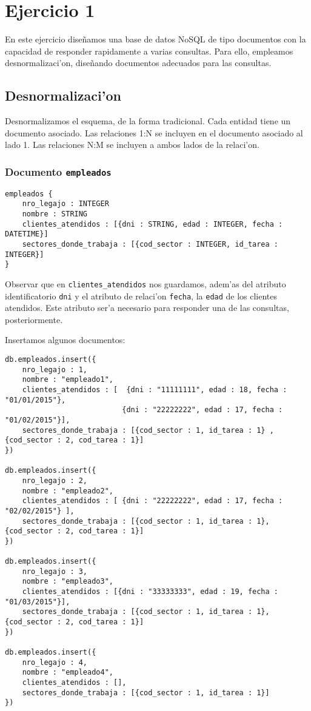 \section{Ejercicio 1}

En este ejercicio dise\~namos una base de datos NoSQL de tipo documentos con la capacidad de responder rapidamente a varias consultas. Para ello, empleamos desnormalizaci'on, dise\~nando documentos adecuados para las consultas.

\subsection{Desnormalizaci'on}

Desnormalizamos el esquema, de la forma tradicional. Cada entidad tiene un documento asociado. Las relaciones 1:N se incluyen en el documento asociado al lado 1. Las relaciones N:M se incluyen a ambos lados de la relaci'on.

\subsubsection{Documento \texttt{empleados}}

\begin{verbatim}
empleados {
    nro_legajo : INTEGER
    nombre : STRING
    clientes_atendidos : [{dni : STRING, edad : INTEGER, fecha : DATETIME}]
    sectores_donde_trabaja : [{cod_sector : INTEGER, id_tarea : INTEGER}]
}
\end{verbatim}

Observar que en \texttt{clientes\_atendidos} nos guardamos, adem'as del atributo identificatorio \texttt{dni} y el atributo de relaci'on \texttt{fecha}, la \texttt{edad} de los clientes atendidos. Este atributo ser'a necesario para responder una de las consultas, posteriormente. 

Insertamos algunos documentos:

\begin{verbatim}
db.empleados.insert({
    nro_legajo : 1,
    nombre : "empleado1",
    clientes_atendidos : [	{dni : "11111111", edad : 18, fecha : "01/01/2015"},
                           {dni : "22222222", edad : 17, fecha : "01/02/2015"}],
    sectores_donde_trabaja : [{cod_sector : 1, id_tarea : 1} , 	{cod_sector : 2, cod_tarea : 1}]
})

db.empleados.insert({
    nro_legajo : 2,
    nombre : "empleado2",
    clientes_atendidos : [ {dni : "22222222", edad : 17, fecha : "02/02/2015"} ],
    sectores_donde_trabaja : [{cod_sector : 1, id_tarea : 1}, 	{cod_sector : 2, cod_tarea : 1}]
})

db.empleados.insert({
    nro_legajo : 3,
    nombre : "empleado3",
    clientes_atendidos : [{dni : "33333333", edad : 19, fecha : "01/03/2015"}],
    sectores_donde_trabaja : [{cod_sector : 1, id_tarea : 1}, 	{cod_sector : 2, cod_tarea : 1}]
})

db.empleados.insert({
    nro_legajo : 4,
    nombre : "empleado4",
    clientes_atendidos : [],
    sectores_donde_trabaja : [{cod_sector : 1, id_tarea : 1}]
})
\end{verbatim}

